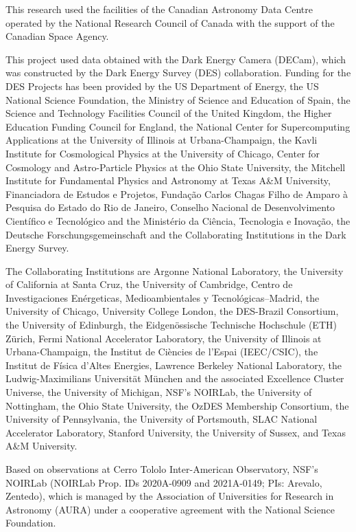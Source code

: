 \documentclass[modern]{aastex631}
\begin{document}
\begin{CJK*}{UTF8}{gbsn}
This research used the facilities of the Canadian Astronomy Data Centre operated by the National Research Council of Canada with the support of the Canadian Space Agency.

This project used data obtained with the Dark Energy Camera (DECam), which was constructed by the Dark Energy Survey (DES) collaboration. Funding for the DES Projects has been provided by the US Department of Energy, the US National Science Foundation, the Ministry of Science and Education of Spain, the Science and Technology Facilities Council of the United Kingdom, the Higher Education Funding Council for England, the National Center for Supercomputing Applications at the University of Illinois at Urbana-Champaign, the Kavli Institute for Cosmological Physics at the University of Chicago, Center for Cosmology and Astro-Particle Physics at the Ohio State University, the Mitchell Institute for Fundamental Physics and Astronomy at Texas A\&M University, Financiadora de Estudos e Projetos, Funda\c{c}\~{a}o Carlos Chagas Filho de Amparo \`{a} Pesquisa do Estado do Rio de Janeiro, Conselho Nacional de Desenvolvimento Cient\'{i}fico e Tecnol\'{o}gico and the Minist\'{e}rio da Ci\^{e}ncia, Tecnologia e Inova\c{c}\~{a}o, the Deutsche Forschungsgemeinschaft and the Collaborating Institutions in the Dark Energy Survey.

The Collaborating Institutions are Argonne National Laboratory, the University of California at Santa Cruz, the University of Cambridge, Centro de Investigaciones En\'{e}rgeticas, Medioambientales y Tecnol\'{o}gicas–Madrid, the University of Chicago, University College London, the DES-Brazil Consortium, the University of Edinburgh, the Eidgen\"{o}ssische Technische Hochschule (ETH) Z\"{u}rich, Fermi National Accelerator Laboratory, the University of Illinois at Urbana-Champaign, the Institut de Ci\`{e}ncies de l’Espai (IEEC/CSIC), the Institut de F\'{i}sica d'Altes Energies, Lawrence Berkeley National Laboratory, the Ludwig-Maximilians Universit\"{a}t M\"{u}nchen and the associated Excellence Cluster Universe, the University of Michigan, NSF's NOIRLab, the University of Nottingham, the Ohio State University, the OzDES Membership Consortium, the University of Pennsylvania, the University of Portsmouth, SLAC National Accelerator Laboratory, Stanford University, the University of Sussex, and Texas A\&M University.

Based on observations at Cerro Tololo Inter-American Observatory, NSF's NOIRLab (NOIRLab Prop. IDs 2020A-0909 and 2021A-0149; PIs: Arevalo, Zentedo), which is managed by the Association of Universities for Research in Astronomy (AURA) under a cooperative agreement with the National Science Foundation.


\end{CJK*}
\end{document}
